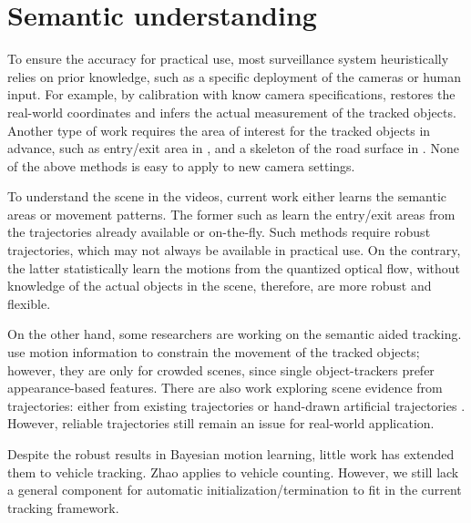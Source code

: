 \section{Semantic understanding}

\label{sec:semantic-related}
To ensure the accuracy for practical use, most surveillance system heuristically relies on prior knowledge, such as a specific deployment of the cameras or human input. For example, by calibration with know camera specifications, \cite{cheng2011intelligent,corral2017slot} restores the real-world coordinates and infers the actual measurement of the tracked objects. Another type of work requires the area of interest for the tracked objects in advance, such as entry/exit area in \cite{tamersoy2009robust,rodriguez2010adaptive,mishra2013video}, and a skeleton of the road surface in \cite{bas2007automatic}. None of the above methods is easy to apply to new camera settings.

To understand the scene in the videos, current work either learns the semantic areas or movement patterns. The former such as \cite{tung2011goal,nedrich2013detecting,yang2012multi} learn the entry/exit areas from the trajectories already available or on-the-fly. Such methods require robust trajectories, which may not always be available in practical use.
On the contrary, the latter \cite{wang2009unsupervised,kuettel2010s,hospedales2009markov,liao2015video} statistically learn the motions from the quantized optical flow, without knowledge of the actual objects in the scene, therefore, are more robust and flexible. 

On the other hand, some researchers are working on the semantic aided tracking. \cite{zhao2012tracking,kratz2010tracking} use motion information to constrain the movement of the tracked objects; however, they are only for crowded scenes, since single object-trackers prefer appearance-based features.
There are also work exploring scene evidence from trajectories: either from existing trajectories \cite{song2010online} or hand-drawn artificial trajectories \cite{manen2014appearances}. However, reliable trajectories still remain an issue for real-world application.

Despite the robust results in Bayesian motion learning, little work has extended them to vehicle tracking.
Zhao \etc \cite{zhao2013counting} applies \cite{wang2009unsupervised} to vehicle counting. However, we still lack a general component for automatic initialization/termination to fit in the current tracking framework.

